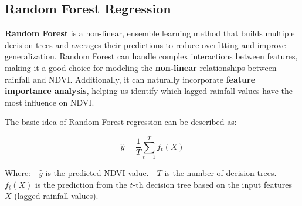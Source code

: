 \documentclass[
]{article}
\begin{document}
\subsection{Random Forest Regression}\label{random-forest-regression}

\textbf{Random Forest} is a non-linear, ensemble learning method that
builds multiple decision trees and averages their predictions to reduce
overfitting and improve generalization. Random Forest can handle complex
interactions between features, making it a good choice for modeling the
\textbf{non-linear} relationships between rainfall and NDVI.
Additionally, it can naturally incorporate \textbf{feature importance
analysis}, helping us identify which lagged rainfall values have the
most influence on NDVI.

The basic idea of Random Forest regression can be described as:

\[
\hat{y} = \frac{1}{T} \sum_{t=1}^{T} f_t(X)
\]

Where: - \(\hat{y}\) is the predicted NDVI value. - \(T\) is the number
of decision trees. - \(f_t(X)\) is the prediction from the \(t\)-th
decision tree based on the input features \(X\) (lagged rainfall
values).
\end{document}
